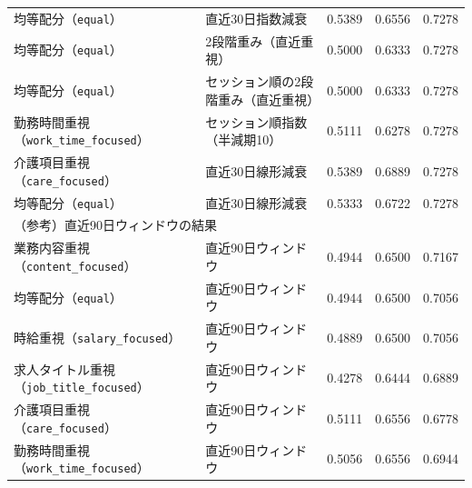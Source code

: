\begin{tabularx}{\linewidth}{X X r r r}
均等配分（\texttt{equal}） & 直近30日指数減衰 & 0.5389 & 0.6556 & 0.7278 \\
均等配分（\texttt{equal}） & 2段階重み（直近重視） & 0.5000 & 0.6333 & 0.7278 \\
均等配分（\texttt{equal}） & セッション順の2段階重み（直近重視） & 0.5000 & 0.6333 & 0.7278 \\
勤務時間重視（\texttt{work\_time\_focused}） & セッション順指数（半減期10） & 0.5111 & 0.6278 & 0.7278 \\
介護項目重視（\texttt{care\_focused}） & 直近30日線形減衰 & 0.5389 & 0.6889 & 0.7278 \\
均等配分（\texttt{equal}） & 直近30日線形減衰 & 0.5333 & 0.6722 & 0.7278 \\
\hline
\multicolumn{5}{l}{（参考）直近90日ウィンドウの結果}\\
業務内容重視（\texttt{content\_focused}） & 直近90日ウィンドウ & 0.4944 & 0.6500 & 0.7167 \\
均等配分（\texttt{equal}） & 直近90日ウィンドウ & 0.4944 & 0.6500 & 0.7056 \\
時給重視（\texttt{salary\_focused}） & 直近90日ウィンドウ & 0.4889 & 0.6500 & 0.7056 \\
求人タイトル重視（\texttt{job\_title\_focused}） & 直近90日ウィンドウ & 0.4278 & 0.6444 & 0.6889 \\
介護項目重視（\texttt{care\_focused}） & 直近90日ウィンドウ & 0.5111 & 0.6556 & 0.6778 \\
勤務時間重視（\texttt{work\_time\_focused}） & 直近90日ウィンドウ & 0.5056 & 0.6556 & 0.6944 \\
\hline
\end{tabularx}
